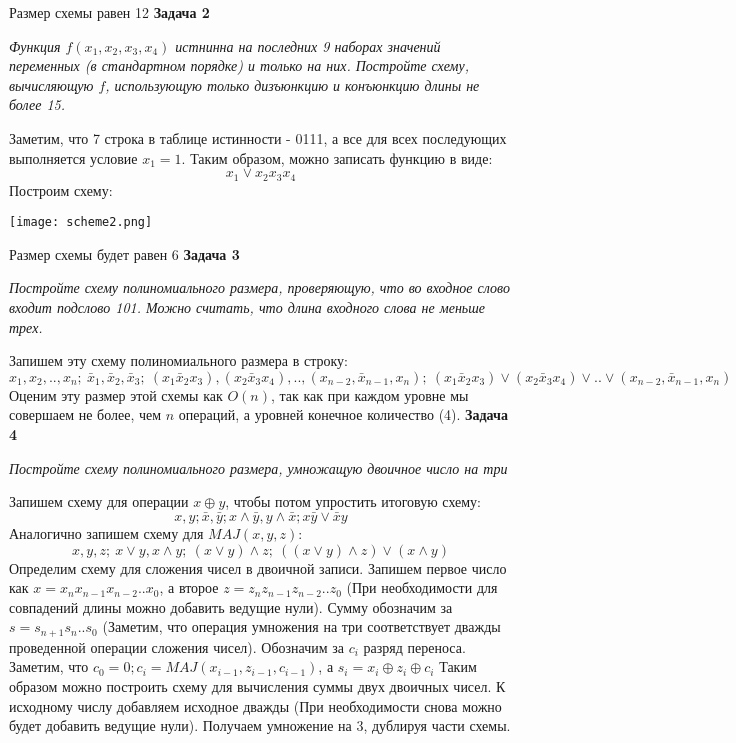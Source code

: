 \documentclass{article}
\begin{document}
Размер схемы равен 12
\newline
\newline
\textbf{Задача 2}
\begin{center}
\textit{Функция $f (x_1, x_2, x_3, x_4)$ истнинна на последних 9 наборах значений переменных (в стандартном порядке) и только на них. Постройте схему, вычисляющую $f$, использующую только дизъюнкцию и конъюнкцию длины не более 15.}
\end{center}
Заметим, что 7 строка в таблице истинности - 0111, а все для всех последующих выполняется условие $x_1=1$. Таким образом, можно записать функцию в виде:
$$x_1 \vee x_2 x_3 x_4$$
Построим схему:
 \begin{center} 
 \texttt{[image: scheme2.png]}
 \end{center}
 Размер схемы будет равен 6
 \newline
 \newline
\textbf{Задача 3}
\begin{center}
\textit{Постройте схему полиномиального размера, проверяющую, что во входное слово входит подслово 101. Можно считать, что длина входного слова не меньше трех. } 
\end{center}
Запишем эту схему полиномиального размера в строку:
$$x_1, x_2,..,x_n;~ \bar{x}_1, \bar{x}_2, \bar{x}_3;~ (x_1 \bar{x}_2 x_3), (x_2 \bar{x}_3 x_4), ..,(x_{n-2},\bar{x}_{n-1},x_n); ~(x_1 \bar{x}_2 x_3)\vee (x_2 \bar{x}_3 x_4)\vee .. \vee (x_{n-2},\bar{x}_{n-1},x_n)$$
Оценим эту размер этой схемы как $O(n)$, так как при каждом уровне мы совершаем не более, чем $n$ операций, а уровней конечное количество (4).
\newline
\newline
 \noindent \textbf{Задача 4}
\begin{center}
\textit{Постройте схему полиномиального размера, умножащую двоичное число на три}
\end{center}
Запишем схему для операции $x \oplus y$, чтобы потом упростить итоговую схему:
$$x, y; \bar{x}, \bar{y}; x\wedge \bar{y}, y\wedge \bar{x}; x\bar{y}\vee \bar{x}y$$
Аналогично запишем схему для $MAJ(x,y,z)$:
$$x, y, z;~ x\vee y, x \wedge y;~ (x\vee y) \wedge z;~((x\vee y) \wedge z) \vee (x \wedge y) $$
Определим схему для сложения чисел в двоичной записи. Запишем первое число как $x=x_n x_{n-1} x_{n-2}..x_0$, а второе $z=z_n z_{n-1} z_{n-2}..z_0$ (При необходимости для совпадений длины можно добавить ведущие нули). Сумму обозначим за $s = s_{n+1} s_n .. s_0$ (Заметим, что операция умножения на три соответствует дважды проведенной операции сложения чисел).  Обозначим за $c_i$ разряд переноса. Заметим, что $c_0 = 0; c_i = MAJ (x_{i-1}, z_{i-1}, c_{i-1})$, а $s_i = x_i \oplus z_i \oplus c_i$ Таким образом можно построить схему для вычисления суммы двух двоичных чисел. К исходному числу добавляем исходное дважды (При необходимости снова можно будет добавить ведущие нули). Получаем умножение на 3, дублируя части схемы.
\end{document}

